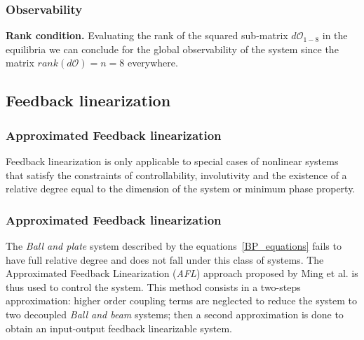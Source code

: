 %
\begin{frame}
\frametitle{Observability}
\textbf{Rank condition.} Evaluating the rank of the squared sub-matrix $d\mathcal{O}_{1-8}$ in the equilibria we can conclude for the global observability of the system since the matrix $rank(d\mathcal{O}) = n = 8$ everywhere.
\end{frame}
%
\subsection{Feedback linearization}
\begin{frame}
\frametitle{Approximated Feedback linearization}
Feedback linearization is only applicable to special cases of nonlinear systems that satisfy the constraints of controllability, involutivity and the existence of a relative degree equal to the dimension of the system or minimum phase property.
\end{frame}
%
\begin{frame}
\frametitle{Approximated Feedback linearization}
The \textit{Ball and plate} system described by the equations~\ref{BP_equations} fails to have full relative degree and does not fall under this class of systems. The Approximated Feedback Linearization (\textit{AFL}) approach proposed by Ming et al. is thus used to control the system. This method consists in a two-steps approximation: higher order coupling terms are neglected to reduce the system to two decoupled \textit{Ball and beam} systems; then a second approximation is done to obtain an input-output feedback linearizable system.
\end{frame}
%

